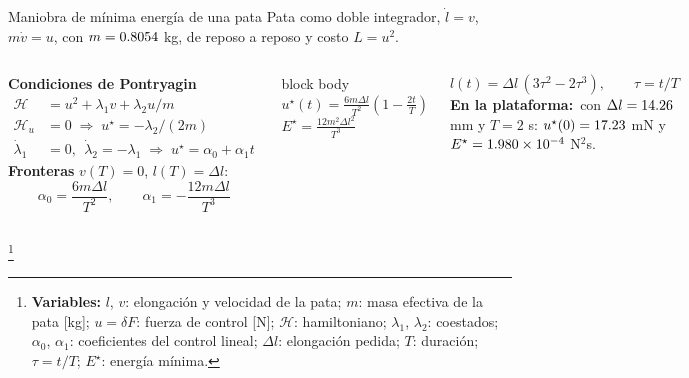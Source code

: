 \documentclass[aspectratio=169,10pt]{beamer}
\newcommand{\variables}[1]{\begingroup\renewcommand{\thefootnote}{}\footnote[frame]{\textbf{Variables:} #1}\addtocounter{footnote}{-1}\endgroup}
\newcommand{\resultado}[1]{\par\smallskip\begin{beamercolorbox}[rounded=true,sep=0.45em,center]{block body}#1\end{beamercolorbox}\par\smallskip}
\newcommand{\valores}{{\color{acento}\textbf{En la plataforma:}}\ }
\begin{document}
\begin{frame}{Maniobra de mínima energía de una pata}
\small
Pata como doble integrador, $\dot l = v$, $m\dot v = u$, con $m = 0.8054$ kg, de reposo a reposo y costo $L = u^2$.

\begin{columns}[T]
\textbf{Condiciones de Pontryagin}
\begin{align*}
\mathcal H &= u^2 + \lambda_1v + \lambda_2u/m\\
\mathcal H_u &= 0\;\Rightarrow\; u^\star = -\lambda_2/(2m)\\
\dot\lambda_1 &= 0,\ \ \dot\lambda_2 = -\lambda_1\;\Rightarrow\; u^\star = \alpha_0 + \alpha_1t
\end{align*}
\textbf{Fronteras} $v(T) = 0$, $l(T) = \Delta l$:
\[
\alpha_0 = \frac{6m\Delta l}{T^2},\qquad \alpha_1 = -\frac{12m\Delta l}{T^3}
\]
\resultado{$\displaystyle u^\star(t) = \frac{6m\Delta l}{T^2}\left(1 - \frac{2t}{T}\right)$\\[0.5em]
$\displaystyle E^\star = \frac{12m^2\Delta l^2}{T^3}$}
\[
l(t) = \Delta l\,(3\tau^2 - 2\tau^3),\qquad \tau = t/T
\]
\valores con $\Delta l = 14.26$ mm y $T = 2$ s: $u^\star(0) = 17.23$ mN y $E^\star = 1.980\times10^{-4}$ N$^2$s.
\end{columns}
\variables{$l$, $v$: elongación y velocidad de la pata; $m$: masa efectiva de la pata [kg]; $u = \delta F$: fuerza de control [N]; $\mathcal H$: hamiltoniano; $\lambda_1$, $\lambda_2$: coestados; $\alpha_0$, $\alpha_1$: coeficientes del control lineal; $\Delta l$: elongación pedida; $T$: duración; $\tau = t/T$; $E^\star$: energía mínima.}
\end{frame}
\end{document}

